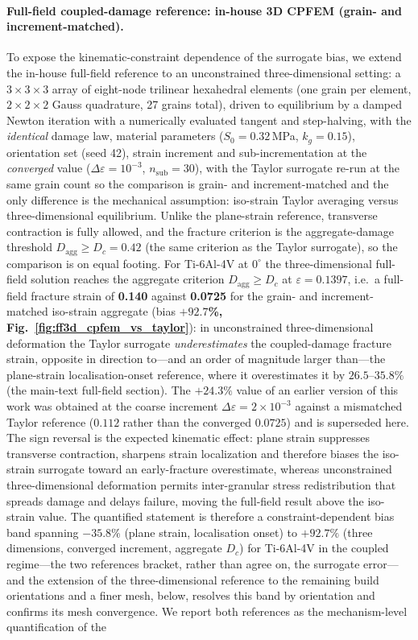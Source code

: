 \documentclass[12pt,a4paper,twocolumn]{article}
\providecommand{\ang}[1]{\ensuremath{#1^{\circ}}}
\begin{document}
\paragraph{Full-field coupled-damage reference: in-house 3D CPFEM (grain- and increment-matched).}
To expose the kinematic-constraint dependence of the surrogate bias, we extend the in-house full-field reference to an unconstrained three-dimensional setting: a $3\times3\times3$ array of eight-node trilinear hexahedral elements (one grain per element, $2\times2\times2$ Gauss quadrature, 27 grains total), driven to equilibrium by a damped Newton iteration with a numerically evaluated tangent and step-halving, with the \emph{identical} damage law, material parameters ($S_0 = 0.32$\,MPa, $k_g = 0.15$), orientation set (seed 42), strain increment and sub-incrementation at the \emph{converged} value ($\Delta\varepsilon = 10^{-3}$, $n_{\mathrm{sub}} = 30$), with the Taylor surrogate re-run at the same grain count so the comparison is grain- and increment-matched and the only difference is the mechanical assumption: iso-strain Taylor averaging versus three-dimensional equilibrium. Unlike the plane-strain reference, transverse contraction is fully allowed, and the fracture criterion is the aggregate-damage threshold $D_{\mathrm{agg}} \ge D_c = 0.42$ (the same criterion as the Taylor surrogate), so the comparison is on equal footing. For Ti-6Al-4V at $\ang{0}$ the three-dimensional full-field solution reaches the aggregate criterion $D_{\mathrm{agg}} \ge D_c$ at $\varepsilon = 0.1397$, i.e.\ a full-field fracture strain of \textbf{0.140} against \textbf{0.0725} for the grain- and increment-matched iso-strain aggregate (bias \textbf{$+92.7$\%, Fig.~\ref{fig:ff3d_cpfem_vs_taylor}}): in unconstrained three-dimensional deformation the Taylor surrogate \emph{underestimates} the coupled-damage fracture strain, opposite in direction to---and an order of magnitude larger than---the plane-strain localisation-onset reference, where it overestimates it by $26.5$--$35.8\%$ (the main-text full-field section). The $+24.3\%$ value of an earlier version of this work was obtained at the coarse increment $\Delta\varepsilon=2\times10^{-3}$ against a mismatched Taylor reference ($0.112$ rather than the converged $0.0725$) and is superseded here. The sign reversal is the expected kinematic effect: plane strain suppresses transverse contraction, sharpens strain localization and therefore biases the iso-strain surrogate toward an early-fracture overestimate, whereas unconstrained three-dimensional deformation permits inter-granular stress redistribution that spreads damage and delays failure, moving the full-field result above the iso-strain value. The quantified statement is therefore a constraint-dependent bias band spanning $-35.8\%$ (plane strain, localisation onset) to $+92.7\%$ (three dimensions, converged increment, aggregate $D_c$) for Ti-6Al-4V in the coupled regime---the two references bracket, rather than agree on, the surrogate error---and the extension of the three-dimensional reference to the remaining build orientations and a finer mesh, below, resolves this band by orientation and confirms its mesh convergence. We report both references as the mechanism-level quantification of the 
\end{document}
